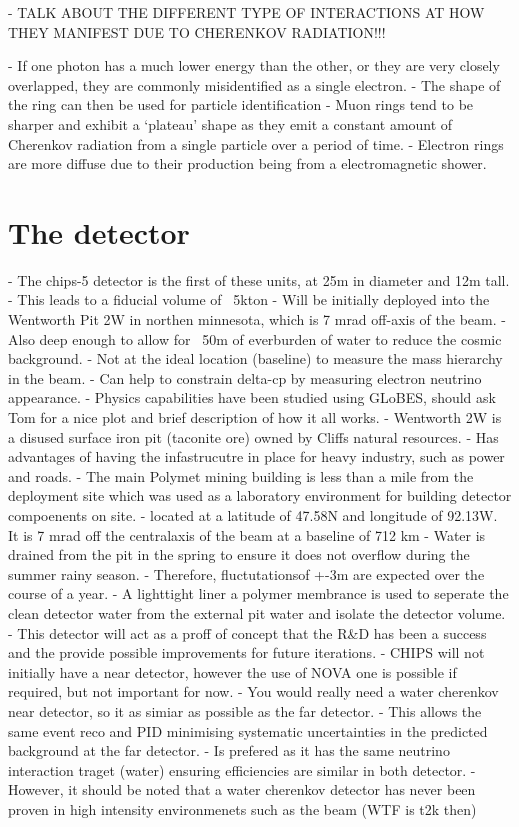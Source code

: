 - TALK ABOUT THE DIFFERENT TYPE OF INTERACTIONS AT HOW THEY MANIFEST DUE TO CHERENKOV RADIATION!!!

- If one photon has a much lower energy than the other, or they are very closely overlapped,
they are commonly misidentified as a single electron.
- The shape of the ring can then be used for particle identification
- Muon rings tend to be sharper and exhibit a `plateau' shape as they emit a constant amount of
Cherenkov radiation from a single particle over a period of time.
- Electron rings are more diffuse due to their production being from a electromagnetic shower.

\section{The \chipsfive detector} %
\label{sec:chips_detector} %

- The chips-5 detector is the first of these units, at 25m in diameter and 12m tall.
- This leads to a fiducial volume of ~5kton
- Will be initially deployed into the Wentworth Pit 2W in northen minnesota, which is 7 mrad
off-axis of the \numi beam.
- Also deep enough to allow for ~50m of everburden of water to reduce the cosmic background.
- Not at the ideal location (baseline) to measure the mass hierarchy in the \numi beam.
- Can help to constrain delta-cp by measuring electron neutrino appearance.
- Physics capabilities have been studied using GLoBES, should ask Tom for a nice plot and brief
description of how it all works.
- Wentworth 2W is a disused surface iron pit (taconite ore) owned by Cliffs natural resources.
- Has advantages of having the infastrucutre in place for heavy industry, such as power and roads.
- The main Polymet mining building is less than a mile from the deployment site which was used as
a laboratory environment for building detector compoenents on site.
- located at a latitude of 47.58N and longitude of 92.13W. It is 7 mrad off the centralaxis of the
\numi beam at a baseline of 712 km
- Water is drained from the pit in the spring to ensure it does not overflow during the summer
rainy season.
- Therefore, fluctutationsof +-3m are expected over the course of a year.
- A lighttight liner a polymer membrance is used to seperate the clean detector water from the
external pit water and isolate the detector volume.
- This detector will act as a proff of concept that the R\&D has been a success and the provide
possible improvements for future iterations.
- CHIPS will not initially have a near detector, however the use of NOVA one is possible if
required, but not important for now.
- You would really need a water cherenkov near detector, so it as simiar as possible as the far
detector.
- This allows the same event reco and PID minimising systematic uncertainties in the predicted
background at the far detector.
- Is prefered as it has the same neutrino interaction traget (water) ensuring efficiencies are
similar in both detector.
- However, it should be noted that a water cherenkov detector has never been proven in high
intensity environmenets such as the \numi beam (WTF is t2k then)

